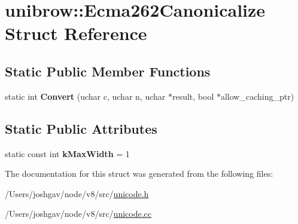 \hypertarget{structunibrow_1_1_ecma262_canonicalize}{}\section{unibrow\+:\+:Ecma262\+Canonicalize Struct Reference}
\label{structunibrow_1_1_ecma262_canonicalize}
\subsection*{Static Public Member Functions}
\begin{DoxyCompactItemize}
\item 
static int {\bfseries Convert} (uchar c, uchar n, uchar $\ast$result, bool $\ast$allow\+\_\+caching\+\_\+ptr)\hypertarget{structunibrow_1_1_ecma262_canonicalize_accc7f53059012c585aea3345818e1c8b}{}\label{structunibrow_1_1_ecma262_canonicalize_accc7f53059012c585aea3345818e1c8b}

\end{DoxyCompactItemize}
\subsection*{Static Public Attributes}
\begin{DoxyCompactItemize}
\item 
static const int {\bfseries k\+Max\+Width} = 1\hypertarget{structunibrow_1_1_ecma262_canonicalize_a5df94ac0193e614eae5cef7ca74c2763}{}\label{structunibrow_1_1_ecma262_canonicalize_a5df94ac0193e614eae5cef7ca74c2763}

\end{DoxyCompactItemize}


The documentation for this struct was generated from the following files\+:\begin{DoxyCompactItemize}
\item 
/\+Users/joshgav/node/v8/src/\hyperlink{unicode_8h}{unicode.\+h}\item 
/\+Users/joshgav/node/v8/src/\hyperlink{unicode_8cc}{unicode.\+cc}\end{DoxyCompactItemize}
